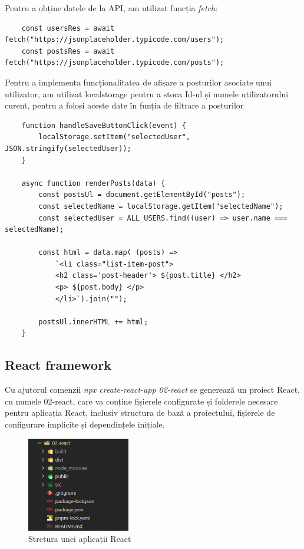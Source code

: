 \documentclass[12pt, a4paper]{report}
\begin{document}
Pentru a obține datele de la API, am utilizat funcția  \emph{fetch}:
\begin{lstlisting}
	const usersRes = await fetch("https://jsonplaceholder.typicode.com/users");
	const postsRes = await fetch("https://jsonplaceholder.typicode.com/posts");
\end{lstlisting}

Pentru a implementa funcționalitatea de afișare a posturilor asociate unui utilizator, am utilizat localstorage pentru a stoca Id-ul și numele utilizatorului curent, pentru a folosi aceste date în funția de filtrare a posturilor
\begin{lstlisting}
	function handleSaveButtonClick(event) {
		localStorage.setItem("selectedUser", JSON.stringify(selectedUser));
	}

	async function renderPosts(data) {
		const postsUl = document.getElementById("posts");
		const selectedName = localStorage.getItem("selectedName");
  		const selectedUser = ALL_USERS.find((user) => user.name === selectedName);

		const html = data.map( (posts) => 
			`<li class="list-item-post"> 
			<h2 class='post-header'> ${post.title} </h2>
			<p> ${post.body} </p>
			</li>`).join("");

	  	postsUl.innerHTML += html;
	}

\end{lstlisting}
\subsection{React framework}

Cu ajutorul comenzii \emph{npx create-react-app 02-react} se generează un proiect React, cu numele 02-react, care va conține fișierele configurate și folderele necesare pentru aplicația React, inclusiv structura de bază a proiectului, fișierele de configurare implicite și dependințele inițiale.

\begin{figure}[htbp]
	\centering
	\includegraphics[width=0.4\textwidth]{react_file_structure.png}
	\caption{Strctura unei aplicații React}
	\label{fig:react-structure}
\end{figure}
\end{document}
